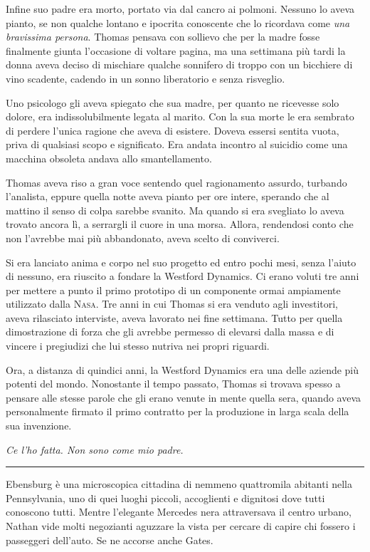 \documentclass[a4paper,oneside,10pt]{memoir}
\begin{document}
Infine suo padre era morto, portato via dal cancro ai polmoni. Nessuno lo aveva pianto, se non qualche lontano e
ipocrita conoscente che lo ricordava come \emph{una bravissima persona}. Thomas pensava con sollievo che per la madre
fosse finalmente giunta l'occasione di voltare pagina, ma una settimana più tardi la donna aveva deciso di mischiare
qualche sonnifero di troppo con un bicchiere di vino scadente, cadendo in un sonno liberatorio e senza risveglio.

Uno psicologo gli aveva spiegato che sua madre, per quanto ne ricevesse solo dolore, era indissolubilmente legata al
marito. Con la sua morte le era sembrato di perdere l'unica ragione che aveva di esistere. Doveva essersi sentita vuota,
priva di qualsiasi scopo e significato. Era andata incontro al suicidio come una macchina obsoleta andava allo
smantellamento.

Thomas aveva riso a gran voce sentendo quel ragionamento assurdo, turbando l'analista, eppure quella notte aveva pianto
per ore intere, sperando che al mattino il senso di colpa sarebbe svanito. Ma quando si era svegliato lo aveva trovato
ancora lì, a serrargli il cuore in una morsa. Allora, rendendosi conto che non l'avrebbe mai più abbandonato, aveva
scelto di conviverci.

Si era lanciato anima e corpo nel suo progetto ed entro pochi mesi, senza l'aiuto di nessuno, era riuscito a fondare la
Westford Dynamics. Ci erano voluti tre anni per mettere a punto il primo prototipo di un componente ormai ampiamente
utilizzato dalla {\scshape Nasa}. Tre anni in cui Thomas si era venduto agli investitori, aveva rilasciato interviste,
aveva lavorato nei fine settimana. Tutto per quella dimostrazione di forza che gli avrebbe permesso di elevarsi dalla
massa e di vincere i pregiudizi che lui stesso nutriva nei propri riguardi.

Ora, a distanza di quindici anni, la Westford Dynamics era una delle aziende più potenti del mondo. Nonostante il tempo
passato, Thomas si trovava spesso a pensare alle stesse parole che gli erano venute in mente quella sera, quando aveva
personalmente firmato il primo contratto per la produzione in larga scala della sua invenzione.

\emph{Ce l'ho fatta. Non sono come mio padre.}

\plainbreak{1}

Ebensburg è una microscopica cittadina di nemmeno quattromila abitanti nella Pennsylvania, uno di quei luoghi piccoli,
accoglienti e dignitosi dove tutti conoscono tutti. Mentre l'elegante Mercedes nera attraversava il centro urbano,
Nathan vide molti negozianti aguzzare la vista per cercare di capire chi fossero i passeggeri dell'auto. Se ne accorse
anche Gates.
\end{document}

